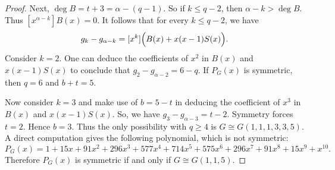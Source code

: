 \documentclass[10pt,a4paper]{amsart}
\begin{document}
\begin{proof}
Next, $\deg B=t+3=\alpha-(q-1)$.
So if \(k\le q-2\), then \(\alpha-k>\deg B\). Thus $[x^{\alpha-k}]B(x)=0$.
It follows that for every \(k\le q-2\), we have
\[
g_k-g_{\alpha-k}
=
[x^k]\Bigl(B(x)+x(x-1)S(x)\Bigr).
\]
Consider \(k=2\). One can deduce the coefficients of $x^2$ in $B(x)$ and $x(x-1)S(x)$ to conclude that $g_2-g_{\alpha-2}=6-q$.
If \(P_G(x)\) is symmetric, then $q=6$ and $b+t=5$.

Now consider \(k=3\) and make use of \(b=5-t\) in deducing the coefficient of $x^3$ in  $B(x)$ and $x(x-1)S(x)$. So, we have $g_3-g_{\alpha-3}=t-2$.
Symmetry forces \(t=2\). Hence \(b=3\). Thus the only  possibility with \(q\ge 4\) is $G\cong G(1,1,1,3,3,5)$.
A direct computation gives the following polynomial, which is not symmetric:
\[
P_G(x)
=
1+15x+91x^2+296x^3+577x^4+714x^5+575x^6+296x^7+91x^8+15x^9+x^{10}.
\]
Therefore \(P_G(x)\) is symmetric if and only if \(G\cong G(1,1,5)\).
\end{proof}
\end{document}

